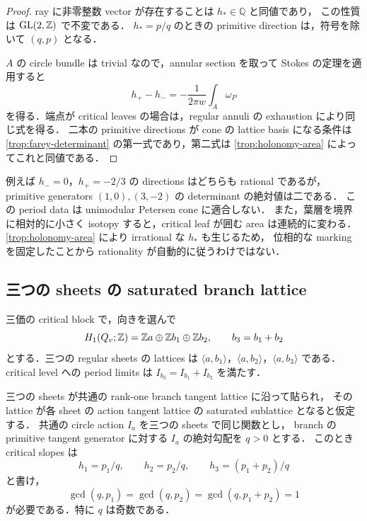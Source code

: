 \begin{proof}
ray に非零整数 vector が存在することは $h_*\in\mathbb Q$ と同値であり，
この性質は $\operatorname{GL}(2,\mathbb Z)$ で不変である．
$h_*=p/q$ のときの primitive direction は，符号を除いて $(q,p)$ となる．

$A$ の circle bundle は trivial なので，annular section を取って Stokes の定理を適用すると
\begin{equation}\label{trop:holonomy-area}
 h_+-h_-=-\frac1{2\pi w}\int_A\omega_P
\end{equation}
を得る．端点が critical leaves の場合は，regular annuli の exhaustion により同じ式を得る．
二本の primitive directions が cone の lattice basis になる条件は
\eqref{trop:farey-determinant} の第一式であり，第二式は
\eqref{trop:holonomy-area} によってこれと同値である．
\end{proof}

例えば $h_-=0$，$h_+=-2/3$ の directions はどちらも rational であるが，
primitive generators $(1,0),(3,-2)$ の determinant の絶対値は二である．
この period data は unimodular Petersen cone に適合しない．
また，葉層を境界に相対的に小さく isotopy すると，critical leaf が囲む area は連続的に変わる．
\eqref{trop:holonomy-area} により irrational な $h_*$ も生じるため，
位相的な marking を固定したことから rationality が自動的に従うわけではない．

\subsection{三つの sheets の saturated branch lattice}

三価の critical block で，向きを選んで
\[
 H_1(Q_v;\mathbb Z)=\mathbb Z a\oplus\mathbb Z b_1\oplus\mathbb Z b_2,
 \qquad b_3=b_1+b_2
\]
とする．三つの regular sheets の lattices は
$\langle a,b_1\rangle$，$\langle a,b_2\rangle$，$\langle a,b_3\rangle$ である．
critical level への period limits は $I_{b_3}=I_{b_1}+I_{b_2}$ を満たす．

\begin{proposition}
\label{trop:branch-denominator}
三つの sheets が共通の rank-one branch tangent lattice に沿って貼られ，
その lattice が各 sheet の action tangent lattice の saturated sublattice となると仮定する．
共通の circle action $I_a$ を三つの sheets で同じ関数とし，
branch の primitive tangent generator に対する $I_a$ の絶対勾配を $q>0$ とする．
このとき critical slopes は
\[
 h_1=p_1/q,\qquad h_2=p_2/q,\qquad h_3=(p_1+p_2)/q
\]
と書け，
\begin{equation}\label{trop:branch-coprime}
 \gcd(q,p_1)=\gcd(q,p_2)=\gcd(q,p_1+p_2)=1
\end{equation}
が必要である．特に $q$ は奇数である．
\end{proposition}


